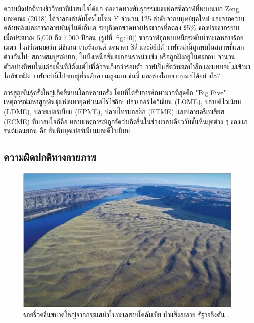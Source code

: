 \documentclass[10pt,twocolumn,letterpaper]{article}
\begin{document}
ความผิดปกติทางชีววิทยาที่น่าสนใจได้แก่ คอขวดทางพันธุกรรมและฟอสซิลวาฬที่พบบนบก Zeng และคณะ (2018) ได้จำลองลำดับโครโมโซม Y จำนวน 125 ลำดับจากมนุษย์ยุคใหม่ และจากความคล้ายคลึงและการกลายพันธุ์ในดีเอ็นเอ ระบุถึงคอขวดทางประชากรที่ลดลง 95\% ของประชากรชาย เมื่อประมาณ 5,000 ถึง 7,000 ปีก่อน (รูปที่ \ref{fig:10}) \cite{62} ซากวาฬถูกพบเหนือระดับน้ำทะเลหลายร้อยเมตร ในสวีเดนบอร์ก มิชิแกน เวอร์มอนต์ แคนาดา ชิลี และอียิปต์ \cite{63,64,65,66} วาฬเหล่านี้ถูกพบในสภาพที่แตกต่างกันไป: สภาพสมบูรณ์มาก, ในบึงเหนือชั้นตะกอนธารน้ำแข็ง หรือถูกฝังอยู่ในตะกอน จำนวนตัวอย่างที่พบในแต่ละพื้นที่มีตั้งแต่ไม่กี่ตัวจนถึงกว่าร้อยตัว วาฬเป็นสัตว์ทะเลน้ำลึกและแทบจะไม่เข้ามาใกล้ชายฝั่ง วาฬเหล่านี้ไปจบอยู่ที่ระดับความสูงมากเช่นนี้ และห่างไกลจากทะเลได้อย่างไร?

การสูญพันธุ์ครั้งใหญ่เกิดขึ้นบนโลกหลายครั้ง โดยที่ได้รับการศึกษามากที่สุดคือ "Big Five" เหตุการณ์มหาสูญพันธุ์แห่งมหายุคฟาเนอโรโซอิก: ปลายออร์โดวิเชียน (LOME), ปลายดีโวเนียน (LDME), ปลายเปอร์เมียน (EPME), ปลายไทรแอสซิก (ETME) และปลายครีเทเชียส (ECME) \cite{88,89} ที่น่าสนใจก็คือ หลายเหตุการณ์ถูกจัดว่าเกิดขึ้นในช่วงเวลาเดียวกับชั้นหินยุคต่าง ๆ ของแกรนด์แคนยอน คือ ชั้นหินยุคเปอร์เมียนและดีโวเนียน

\subsection{ความผิดปกติทางกายภาพ}

\begin{figure}[t]
\begin{center}
   \includegraphics[width=1\linewidth]{columbia.jpg}
\end{center}
   \caption{รอยริ้วคลื่นขนาดใหญ่จากกระแสน้ำในทะเลสาบโคลัมเบีย น้ำแข็งละลาย รัฐวอชิงตัน \cite{80}.}
\label{fig:11}
\label{fig:onecol}
\end{figure}
\end{document}
